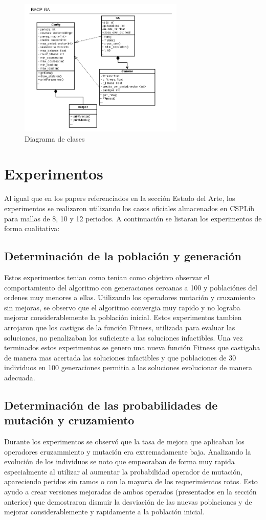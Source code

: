 \documentclass[letter, 10pt]{article}
\begin{document}
\begin{figure}[h!]
  \centering
  \includegraphics[width=0.7\textwidth]{ga}
  \caption{Diagrama de clases}
\end{figure}

\section{Experimentos}
\label{experimentos}
Al igual que en los papers referenciados en la sección Estado del Arte, los
experimentos se realizaron utilizando los casos oficiales almacenados en CSPLib
para mallas de 8, 10 y 12 periodos. A continuación se listaran los experimentos
de forma cualitativa:

\subsection{Determinación de la población y generación}
Estos experimentos tenian como tenian como objetivo observar el comportamiento
del algoritmo con generaciones cercanas a 100 y poblaciónes del ordenes muy
menores a ellas.  Utilizando los operadores mutación y cruzamiento sin mejoras,
se observo que el algoritmo convergia muy rapido y no lograba mejorar
considerablemente la población inicial. Estos experimentos tambien arrojaron que
los castigos de la función Fitness, utilizada para evaluar las soluciones, no
penalizaban los suficiente a las soluciones infactibles. Una vez terminados
estos experimentos se genero una nueva función Fitness que castigaba de manera
mas acertada las soluciones infactibles y que poblaciones de 30 individuos en
100 generaciones permitia a las soluciones evolucionar de manera adecuada.

\subsection{Determinación de las probabilidades de mutación y cruzamiento}
Durante los experimentos se observó que la tasa de mejora que aplicaban los
operadores cruzammiento y mutación era extremadamente baja. Analizando la
evolución de los individuos se noto que empeoraban de forma muy rapida
especialmente al utilizar al aumentar la probabilidad operador de mutación,
apareciendo peridos sin ramos o con la mayoria de los requerimientos rotos.
Esto ayudo a crear versiones mejoradas de ambos operados (presentados en la
sección anterior) que demostraron dismuir la desviación de las nuevas
poblaciones y de mejorar considerablemente y rapidamente a la población inicial.
\end{document}
